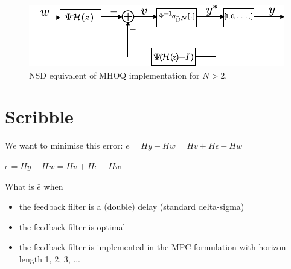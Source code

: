 \documentclass[a4paper]{article}
\begin{document}
\begin{figure}[!h]
	\centering
	\includegraphics[scale = 2]{figures/nsd_mhoq_implementation_N2.pdf}
	\caption{NSD equivalent of MHOQ implementation for $N>2$.}
	\label{fig:nsd_mhoq_implementation_N2}
\end{figure}



\newpage

 

\section{Scribble}

We want to minimise this error: $\bar{e} = H y - H w = H v + H \epsilon - H w$

$\bar{e} = H y - H w = H v + H \epsilon - H w$

What is $\bar{e}$ when
\begin{itemize}
    \item the feedback filter is a (double) delay (standard delta-sigma)
    \item the feedback filter is optimal
    \item the feedback filter is implemented in the MPC formulation with horizon length 1, 2, 3, ...
\end{itemize}
\end{document}
